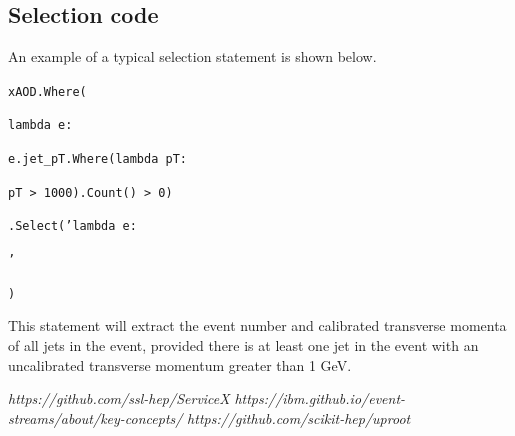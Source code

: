 \documentclass{webofc}
\begin{document}
\subsection{Selection code}
\label{subsec:select}

An example of a typical selection statement is shown below.

\bigskip

{\raggedright \footnotesize
  \texttt{xAOD.Where(}

  \texttt{\quad lambda e: }

  \texttt{\quad \quad e.jet\_pT.Where(lambda pT: }

  \texttt{\quad \quad pT > 1000).Count() > 0)}

  \texttt{\quad .Select('lambda e: }

  \texttt{\quad {}'}

  \texttt{)}
}

\bigskip

This statement will extract the event number and calibrated transverse momenta of all jets in the
event, provided there is at least one jet in the event with an uncalibrated transverse momentum
greater than 1 GeV.

%
% 
%
%
\begin{thebibliography}{}
%
%
\textit{https://github.com/ssl-hep/ServiceX}
\textit{https://ibm.github.io/event-streams/about/key-concepts/}
\textit{https://github.com/scikit-hep/uproot}
\end{thebibliography}
\end{document}
